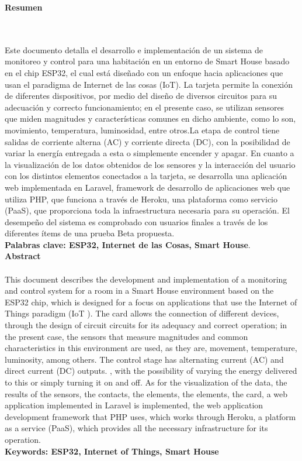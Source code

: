 \newpage
\thispagestyle{empty} \textbf{}\normalsize
\textbf{\LARGE Resumen}
\markboth{}{}
\\\\
 Este documento detalla el desarrollo e implementación de un sistema de monitoreo y control para una habitación en un entorno de Smart House basado en el chip ESP32, el cual está diseñado con un enfoque hacia aplicaciones que usan el paradigma de Internet de las cosas (IoT). La tarjeta permite la conexión de diferentes dispositivos, por medio del diseño de diversos circuitos para su adecuación y correcto funcionamiento; en el presente caso, se utilizan sensores que miden magnitudes y características comunes en dicho ambiente, como lo son, movimiento, temperatura, luminosidad, entre otros.La etapa de control tiene salidas de corriente alterna (AC) y corriente directa (DC), con la posibilidad de variar la energía entregada a esta o simplemente encender y apagar. En cuanto a la visualización de los datos obtenidos de los sensores y la interacción del usuario con los distintos elementos conectados a la tarjeta, se desarrolla una aplicación web implementada en Laravel, framework de desarrollo de aplicaciones web que utiliza PHP, que funciona a través de Heroku, una plataforma como servicio (PaaS), que proporciona toda la infraestructura necesaria para su operación. El desempeño del sistema es comprobado con usuarios finales a través de los diferentes ítems de una prueba Beta propuesta.\\
 
\textbf{\small Palabras clave: ESP32, Internet de las Cosas, Smart House}.\\[1.0cm]

\textbf{\LARGE Abstract}\\\\
This document describes the development and implementation of a monitoring and control system for a room in a Smart House environment based on the ESP32 chip, which is designed for a focus on applications that use the Internet of Things paradigm (IoT ). The card allows the connection of different devices, through the design of circuit circuits for its adequacy and correct operation; in the present case, the sensors that measure magnitudes and common characteristics in this environment are used, as they are, movement, temperature, luminosity, among others. The control stage has alternating current (AC) and direct current (DC) outputs. , with the possibility of varying the energy delivered to this or simply turning it on and off. As for the visualization of the data, the results of the sensors, the contacts, the elements, the elements, the card, a web application implemented in Laravel is implemented, the web application development framework that PHP uses, which works through Heroku, a platform as a service (PaaS), which provides all the necessary infrastructure for its operation.\\

\textbf{\small Keywords: ESP32, Internet of Things, Smart House}